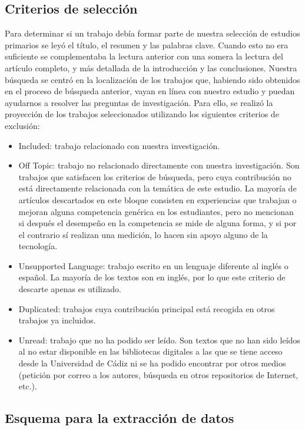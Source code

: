 \subsection{Criterios de selección}
\label{sec:CriteriosBusqueda}
Para determinar si un trabajo debía formar parte de nuestra selección de estudios primarios se leyó el título, el resumen y las palabras clave. Cuando esto no era suficiente se complementaba la lectura anterior con una somera la lectura del artículo completo, y más detallada de la introducción y las conclusiones.
Nuestra búsqueda se centró en la localización de los trabajos que, habiendo sido obtenidos en el proceso de búsqueda anterior, vayan en línea con nuestro estudio y puedan ayudarnos a resolver las preguntas de investigación. Para ello, se realizó la proyección de los trabajos seleccionados utilizando los siguientes criterios de exclusión:
\begin{itemize}
\item Included: trabajo relacionado con nuestra investigación.
\item Off Topic: trabajo no relacionado directamente con nuestra investigación. Son trabajos que satisfacen los criterios de búsqueda, pero cuya contribución no está directamente relacionada con la temática de este estudio. La mayoría de artículos descartados en este bloque consisten en experiencias que trabajan o mejoran alguna competencia genérica en los estudiantes, pero no mencionan si después el desempeño en la competencia se mide de alguna forma, y si por el contrario sí realizan una medición, lo hacen sin apoyo alguno de la tecnología.
\item Unsupported Language: trabajo escrito en un lenguaje diferente al inglés o español. La mayoría de los textos son en inglés, por lo que este criterio de descarte apenas es utilizado.
\item Duplicated: trabajos cuya contribución principal está recogida en otros trabajos ya incluidos. 
\item Unread: trabajo que no ha podido ser leído. Son textos que no han sido leídos al no estar disponible en las bibliotecas digitales a las que se tiene acceso desde la Universidad de Cádiz ni se ha podido encontrar por otros medios (petición por correo a los autores, búsqueda en otros repositorios de Internet, etc.).
\end{itemize}

\subsection{Esquema para la extracción de datos}
\label{sec:EsquemaBusqueda}

